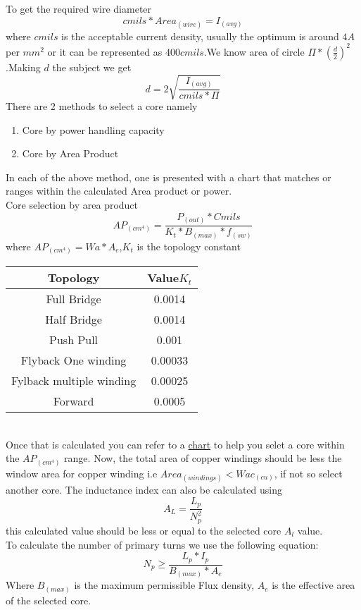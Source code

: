 \documentclass{article}
\begin{document}
To get the required wire diameter \begin{equation*}
    cmils * Area_(wire) = I_(avg)
\end{equation*} where $cmils$ is the acceptable current density, usually the optimum is around $4A$ per $mm^2$ or it can be represented as $400cmils$.We know area of circle $\Pi * \left(\frac{d}{2}\right)^2$.Making $d$ the subject we get \begin{equation}\label{wirediameter}
    d = 2\sqrt{\frac{I_(avg)}{cmils *\Pi}}
\end{equation}
There are 2 methods to select a core namely \begin{enumerate}
    \item Core by power handling capacity
    \item Core by Area Product
\end{enumerate}
In each of the above method, one is presented with a chart that matches or ranges within the calculated Area product or power.
\\
Core selection by area product \begin{equation}
    AP_(cm^4) = \frac{P_(out)*Cmils}{K_t * B_(max) * f_(sw)}
\end{equation}where $AP_(cm^4) = Wa * A_e$,$K_t$ is the topology constant\\
\begin{tabular}{|c|c|} \hline
    Topology & Value$K_t$  \\ \hline
    Full Bridge & 0.0014  \\ \hline
    Half Bridge & 0.0014 \\ \hline
    Push Pull & 0.001  \\ \hline
    Flyback One winding & 0.00033  \\ \hline
    Fylback multiple winding & 0.00025 \\ \hline
    Forward & 0.0005 \\
    \hline
\end{tabular}\\
Once that is calculated you can refer to a \href{https://www.mag-inc.com/Design/Design-Guides/Transformer-Design-with-Magnetics-Ferrite-Cores}{chart} to help you selet a core within the $AP_(cm^4)$ range.
Now, the total area of copper windings should be less the window area for copper winding i.e $Area_(windings)<Wac_(cu)$, if not so select another core.
The inductance index can also be calculated using \begin{equation} \label{inductanceindex}
    A_L = \frac{L_p}{N_p^2}
\end{equation}
this calculated value should be less or equal to the selected core $A_l$ value.
\\
To calculate the number of primary turns we use the following equation:\begin{equation} \label{primaryturns}
    N_p \geq \frac{L_p*I_p}{B_(max) * A_e}
\end{equation} Where $B_(max)$ is the maximum permissible Flux density, $A_e$ is the effective area of the selected core.
\\
\end{document}
